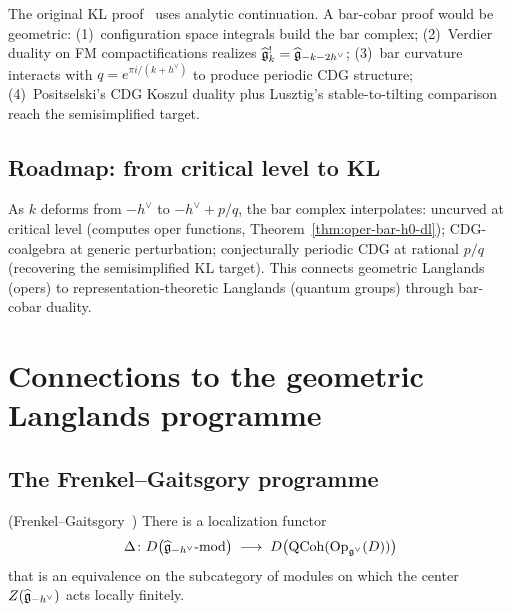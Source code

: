 \begin{remark}
\label{rem:geometric-proof-kl}
The original KL proof~\cite{KL93} uses analytic continuation.
A bar-cobar proof would be geometric: (1)~configuration space
integrals build the bar complex; (2)~Verdier duality on FM
compactifications realizes
$\widehat{\mathfrak{g}}_k^! = \widehat{\mathfrak{g}}_{-k-2h^\vee}$; (3)~bar curvature
interacts with $q = e^{\pi i/(k+h^\vee)}$ to produce periodic CDG
structure; (4)~Positselski's CDG Koszul duality plus Lusztig's
stable-to-tilting comparison reach the semisimplified target.
\end{remark}


\subsection{Roadmap: from critical level to KL}

\begin{remark}
\label{rem:critical-admissible}
As $k$ deforms from $-h^\vee$ to $-h^\vee + p/q$, the bar complex
interpolates: uncurved at critical level (computes oper functions,
Theorem~\ref{thm:oper-bar-h0-dl}); CDG-coalgebra at generic
perturbation; conjecturally periodic CDG at rational $p/q$
(recovering the semisimplified KL target).  This connects geometric
Langlands (opers) to representation-theoretic Langlands (quantum
groups) through bar-cobar duality.
\end{remark}



\section{Connections to the geometric Langlands programme}
\label{sec:langlands-connections}

\subsection{The Frenkel--Gaitsgory programme}

\begin{theorem}
\label{thm:fg-localization}
\textup{(}Frenkel--Gaitsgory~\cite{FG06}\textup{)}\quad
There is a localization functor
\[
\Delta\colon
D\bigl(\widehat{\mathfrak{g}}_{-h^\vee}\text{-mod}\bigr)
\;\longrightarrow\;
D\bigl(\mathrm{QCoh}(\mathrm{Op}_{\mathfrak{g}^\vee}(D))\bigr)
\]
that is an equivalence on the subcategory of modules on which the
center $Z(\widehat{\mathfrak{g}}_{-h^\vee})$ acts locally finitely.
\end{theorem}

